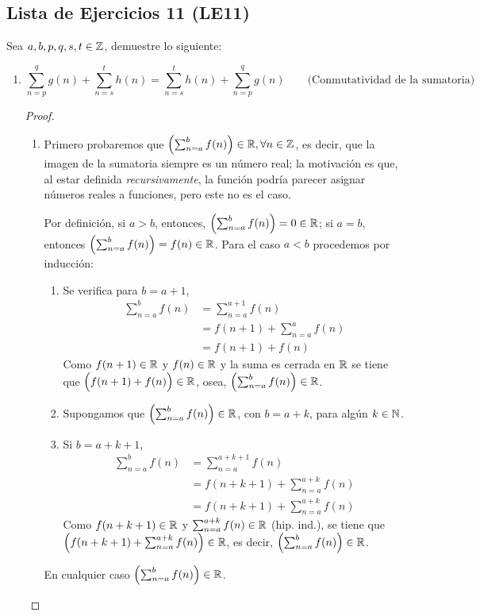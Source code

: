 \subsection*{Lista de Ejercicios 11 (LE11)}

Sea $a,b,p,q,s,t\in \mathbb{Z}$, demuestre lo siguiente:

\begin{enumerate}[label=\alph*)]
  \item \[\sum_{n=p}^{q} g(n) + \sum_{n=s}^{t} h(n) = \sum_{n=s}^{t} h(n) + \sum_{n=p}^{q} g(n)\qquad \text{(Conmutatividad de la sumatoria)}\]
  \begin{proof}\leavevmode
    \begin{enumerate}[label=\Roman*.]
      \item Primero probaremos que $\Bigl(\sum_{n=a}^{b} f(n)\Bigr)\in \mathbb{R},\forall n\in \mathbb{Z}$, es decir, que la imagen de la sumatoria siempre es un número real; la motivación es que, al estar definida \textit{recursivamente}, la función podría parecer asignar números reales a funciones, pero este no es el caso.
      
      Por definición, si $a>b$, entonces, $\Bigl(\sum_{n=a}^{b} f(n)\Bigr)=0\in \mathbb{R}$; si $a=b$, entonces $\Bigl(\sum_{n=a}^{b} f(n)\Bigr)=f(n)\in \mathbb{R}$. Para el caso $a<b$ procedemos por inducción:
      \begin{enumerate}[label=\roman*)]
        \item Se verifica para $b=a+1$,
        \begin{align*}
          \sum_{n=a}^{b} f(n) &= \sum_{n=a}^{a+1} f(n)\\
          &= f(n+1) + \sum_{n=a}^{a} f(n)\\
          &= f(n+1) + f(n)
        \end{align*}
        Como $f(n+1)\in \mathbb{R}$ y $f(n)\in \mathbb{R}$ y la suma es cerrada en $\mathbb{R}$ se tiene que $\Bigl(f(n+1) + f(n)\Bigr)\in \mathbb{R}$, osea, $\Bigl(\sum_{n=a}^{b} f(n)\Bigr)\in \mathbb{R}$.
        \item Supongamos que $\Bigl(\sum_{n=a}^{b} f(n)\Bigr)\in \mathbb{R}$, con $b=a+k$, para algún $k\in \mathbb{N}$.
      \item Si $b=a+k+1$,
      \begin{align*}
        \sum_{n=a}^{b} f(n) &= \sum_{n=a}^{a+k+1} f(n)\\
        &= f(n+k+1) + \sum_{n=a}^{a+k} f(n)\\
        &= f(n+k+1) + \sum_{n=a}^{a+k} f(n)
      \end{align*}
      Como $f(n+k+1)\in \mathbb{R}$ y $\sum_{n=a}^{a+k} f(n)\in \mathbb{R}$ (hip. ind.), se tiene que $\Bigl(f(n+k+1) + \sum_{n=a}^{a+k} f(n)\Bigr)\in \mathbb{R}$, es decir, $\Bigl(\sum_{n=a}^{b} f(n)\Bigr)\in \mathbb{R}$.
      \end{enumerate}
      En cualquier caso $\Bigl(\sum_{n=a}^{b} f(n)\Bigr)\in \mathbb{R}$.
    


\end{enumerate}
\end{proof}
\end{enumerate}
